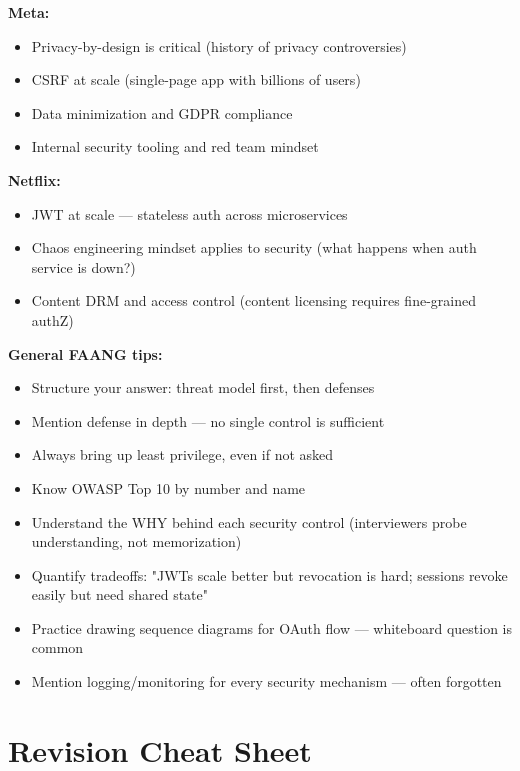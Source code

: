 \documentclass[11pt]{article}
\providecommand{\tightlist}{\setlength{\itemsep}{1pt}\setlength{\parskip}{0pt}}
\begin{document}
\textbf{Meta:}

\begin{itemize}
\tightlist
\item
  Privacy-by-design is critical (history of privacy controversies)
\item
  CSRF at scale (single-page app with billions of users)
\item
  Data minimization and GDPR compliance
\item
  Internal security tooling and red team mindset
\end{itemize}

\textbf{Netflix:}

\begin{itemize}
\tightlist
\item
  JWT at scale --- stateless auth across microservices
\item
  Chaos engineering mindset applies to security (what happens when auth service is down?)
\item
  Content DRM and access control (content licensing requires fine-grained authZ)
\end{itemize}

\textbf{General FAANG tips:}

\begin{itemize}
\tightlist
\item
  Structure your answer: threat model first, then defenses
\item
  Mention defense in depth --- no single control is sufficient
\item
  Always bring up least privilege, even if not asked
\item
  Know OWASP Top 10 by number and name
\item
  Understand the WHY behind each security control (interviewers probe understanding, not memorization)
\item
  Quantify tradeoffs: "JWTs scale better but revocation is hard; sessions revoke easily but need shared state"
\item
  Practice drawing sequence diagrams for OAuth flow --- whiteboard question is common
\item
  Mention logging/monitoring for every security mechanism --- often forgotten
\end{itemize}

\section{Revision Cheat Sheet}\label{revision-cheat-sheet}
\end{document}

